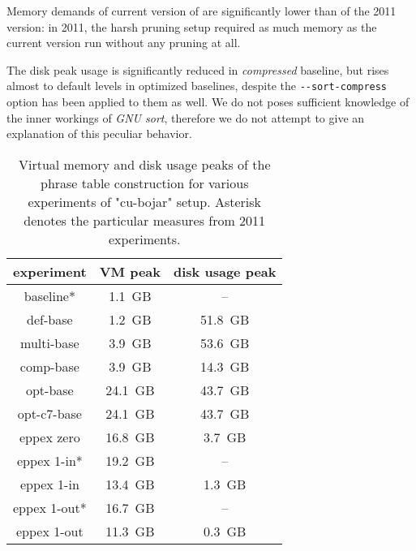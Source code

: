 Memory demands of current version of \eppex{} are significantly lower than of the 2011 version:
in 2011, the harsh pruning setup required as much memory as the current version run without
any pruning at all.

The disk peak usage is significantly reduced in \emph{compressed} baseline, but rises almost to
default levels in optimized baselines, despite the \verb|--sort-compress| option has been applied
to them as well.
We do not poses sufficient knowledge of the inner workings of \emph{GNU sort}, therefore we do not
attempt to give an explanation of this peculiar behavior.

\begin{table}[ht]
\centering
\begin{tabular}{ | c | c | c | }
\hline
experiment & VM peak & disk usage peak \\
\hline
\hline
baseline*     &  1.1~GB &      -- \\
def-base      &  1.2~GB & 51.8~GB \\
multi-base    &  3.9~GB & 53.6~GB \\
comp-base     &  3.9~GB & 14.3~GB \\
opt-base      & 24.1~GB & 43.7~GB \\
opt-c7-base   & 24.1~GB & 43.7~GB \\
eppex zero    & 16.8~GB &  3.7~GB \\
\hline
eppex 1-in*   & 19.2~GB &      -- \\
eppex 1-in    & 13.4~GB &  1.3~GB \\
\hline
eppex 1-out*  & 16.7~GB &      -- \\
eppex 1-out   & 11.3~GB &  0.3~GB \\
\hline
\end{tabular}
\caption{\label{cu-bojar-vm-and-du-peaks}
Virtual memory and disk usage peaks of the phrase table construction for various experiments
of "cu-bojar" setup. Asterisk denotes the particular measures from 2011 experiments.}
\end{table}
